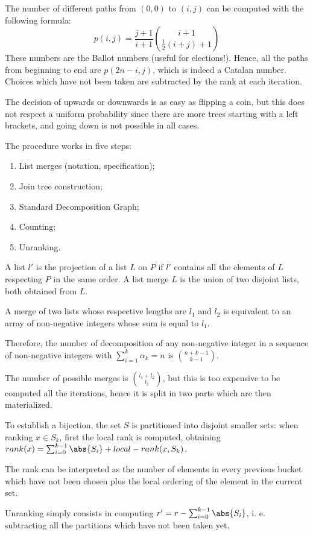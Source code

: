The number of different paths from $(0, 0)$ to $(i, j)$ can be computed with the following formula:
$$p(i, j) = \frac{j+1}{i+1} {{i+1}\choose{\frac{1}{2}(i+j)+1}}$$
These numbers are the Ballot numbers (useful for elections!). Hence, all the paths from beginning to end are $p(2n - i, j)$, which is indeed a Catalan number. Choices which have not been taken are subtracted by the rank at each iteration.

The decision of upwards or downwards is as easy as flipping a coin, but this does not respect a uniform probability since there are more trees starting with a left brackets, and going down is not possible in all cases. 

The procedure works in five steps:
\begin{enumerate}
	\item List merges (notation, specification);
	\item Join tree construction;
	\item Standard Decomposition Graph;
	\item Counting;
	\item Unranking.
\end{enumerate}
A list $l'$ is the projection of a list $L$ on $P$ if $l'$ contains all the elements of $L$ respecting $P$ in the same order. A list merge $L$ is the union of two disjoint lists, both obtained from $L$.

A merge of two lists whose respective lengths are $l_1$ and $l_2$ is equivalent to an array of non-negative integers whose sum is equal to $l_1$. 

Therefore, the number of decomposition of any non-negative integer in a sequence of non-negative integers with $\sum_{i=1}^{k} \alpha_k = n$ is ${n+k-1}\choose{k-1}$.

The number of possible merges is ${l_1+l_2}\choose{l_2}$, but this is too expensive to be computed all the iterations, hence it is split in two parts which are then materialized. 

To establish a bijection, the set $S$ is partitioned into disjoint smaller sets: when ranking $x \in S_k$, first the local rank is computed, obtaining $rank(x) = \sum_{i=0}^{k-1} \abs{S_i} + local-rank(x, S_k)$.

The rank can be interpreted as the number of elements in every previous bucket which have not been chosen plus the local ordering of the element in the current set. 

Unranking simply consists in computing $r' = r - \sum_{i=0}^{k-1} \abs{S_i}$, i. e. subtracting all the partitions which have not been taken yet. 

